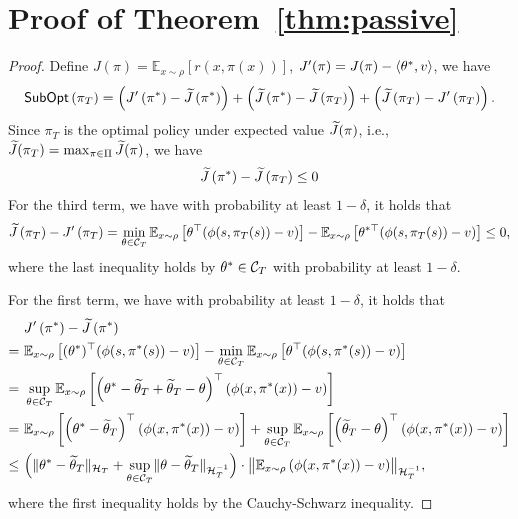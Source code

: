 \section{Proof of Theorem~\ref{thm:passive}}
\begin{proof}
    Define $J(\pi) = \mathbb{E}_{x \sim \rho} [r\left(x, \pi(x)\right)]$, $J'(\pi) = J(\pi) - \langle \theta^*, v \rangle$, we have
    \begin{align*}
        \operatorname*{\mathsf{SubOpt}}\left(\pi_T\right)= \left(J^{\prime}\left(\pi^{*}\right)-\widetilde{J}\left(\pi^*\right)\right)+\left(\widetilde{J}\left(\pi^*\right)-\widetilde{J}\left(\pi_T\right)\right)+\left(\widetilde{J}\left(\pi_T\right)-J^{\prime}\left(\pi_T\right)\right).
    \end{align*}
    Since $\pi_T$ is the optimal policy under expected value $\widetilde{J}(\pi)$, i.e., $\widetilde{J}(\pi_T) = \max_{\pi \in \Pi} \widetilde{J}(\pi)$, we have
    \begin{align}
    \label{eq:passive-1}
      \widetilde{J}\left(\pi^*\right)-\widetilde{J}\left(\pi_T\right) \leq 0
    \end{align}
    For the third term, we have with probability at least $1-\delta$, it holds that
    \begin{align}
    \label{eq:passive-2}
      \widetilde{J}\left(\pi_T\right)-J^{\prime}\left(\pi_T\right) = \min_{\theta \in \mathcal{C}_T} \mathbb{E}_{x \sim \rho}\left[\theta^{\top}(\phi(s, \pi_T(s))-v)\right]-\mathbb{E}_{x \sim \rho}\left[\theta^{* \top}(\phi(s, \pi_T(s))-v)\right] \leq 0,
    \end{align}
    where the last inequality holds by $\theta^* \in \mathcal{C}_T$ with probability at least $1-\delta$.

    For the first term, we have with probability at least $1-\delta$, it holds that
    \begin{align*}
      & J^{\prime}\left(\pi^{*}\right)-\Jt\left(\pi^*\right) \nonumber\\
    = \ & \mathbb{E}_{x \sim \rho}\left[(\theta^*)^{\top}(\phi(s, \pi^*(s))-v)\right]- \min_{\theta \in \C_T} \mathbb{E}_{x \sim \rho}\left[\theta^{\top}(\phi(s, \pi^*(s))-v)\right] \\
    = \ & \sup_{\theta \in \C_T} \mathbb{E}_{x \sim \rho}\left[\left(\theta^*-\thetat_T+\thetat_T-\theta\right)^{\top}\left(\phi(x,\pi^*(x))-v\right)\right] \\
    = \ & \mathbb{E}_{x \sim \rho}\left[\left(\theta^*-\thetat_T\right)^{\top}\left(\phi(x,\pi^*(x))-v\right)\right]+\sup_{\theta \in \C_T} \mathbb{E}_{x \sim \rho}\left[\left(\thetat_T-\theta\right)^{\top}\left(\phi(x,\pi^*(x))-v\right)\right] \\
    \leq \ & \Big(\norm{\theta^*-\thetat_T}_{\H_T} + \sup_{\theta \in \C_T}\norm{\theta-\thetat_T}_{\H_T^{-1}}\Big) \cdot \bignorm{\mathbb{E}_{x \sim \rho} \left(\phi(x,\pi^*(x))-v\right)}_{\H_T^{-1}},
    \end{align*}
    where the first inequality holds by the Cauchy-Schwarz inequality. 
    

\end{proof}

